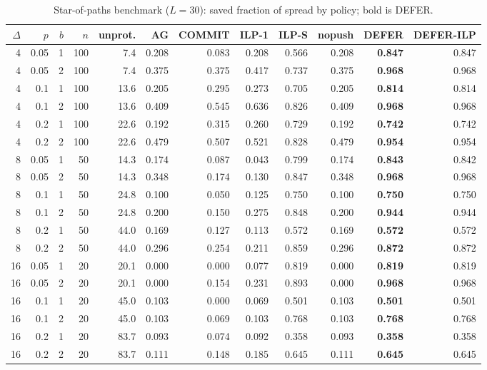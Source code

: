\documentclass[11pt]{article}
\theoremstyle{definition}
\theoremstyle{remark}
\begin{document}
\begin{table}[h]
\centering
\caption{Star-of-paths benchmark ($L=30$): saved fraction of spread by policy; bold is DEFER.\label{tab:sop}}
\footnotesize
\begin{tabular}{rrrrrrrrrrrr}
\hline
$\Delta$ & $p$ & $b$ & $n$ & unprot. & AG & COMMIT & ILP-1 & ILP-S & nopush & DEFER & DEFER-ILP \\
\hline
4 & 0.05 & 1 & 100 & 7.4 & 0.208 & 0.083 & 0.208 & 0.566 & 0.208 & \textbf{0.847} & 0.847 \\
4 & 0.05 & 2 & 100 & 7.4 & 0.375 & 0.375 & 0.417 & 0.737 & 0.375 & \textbf{0.968} & 0.968 \\
4 & 0.1 & 1 & 100 & 13.6 & 0.205 & 0.295 & 0.273 & 0.705 & 0.205 & \textbf{0.814} & 0.814 \\
4 & 0.1 & 2 & 100 & 13.6 & 0.409 & 0.545 & 0.636 & 0.826 & 0.409 & \textbf{0.968} & 0.968 \\
4 & 0.2 & 1 & 100 & 22.6 & 0.192 & 0.315 & 0.260 & 0.729 & 0.192 & \textbf{0.742} & 0.742 \\
4 & 0.2 & 2 & 100 & 22.6 & 0.479 & 0.507 & 0.521 & 0.828 & 0.479 & \textbf{0.954} & 0.954 \\
8 & 0.05 & 1 & 50 & 14.3 & 0.174 & 0.087 & 0.043 & 0.799 & 0.174 & \textbf{0.843} & 0.842 \\
8 & 0.05 & 2 & 50 & 14.3 & 0.348 & 0.174 & 0.130 & 0.847 & 0.348 & \textbf{0.968} & 0.968 \\
8 & 0.1 & 1 & 50 & 24.8 & 0.100 & 0.050 & 0.125 & 0.750 & 0.100 & \textbf{0.750} & 0.750 \\
8 & 0.1 & 2 & 50 & 24.8 & 0.200 & 0.150 & 0.275 & 0.848 & 0.200 & \textbf{0.944} & 0.944 \\
8 & 0.2 & 1 & 50 & 44.0 & 0.169 & 0.127 & 0.113 & 0.572 & 0.169 & \textbf{0.572} & 0.572 \\
8 & 0.2 & 2 & 50 & 44.0 & 0.296 & 0.254 & 0.211 & 0.859 & 0.296 & \textbf{0.872} & 0.872 \\
16 & 0.05 & 1 & 20 & 20.1 & 0.000 & 0.000 & 0.077 & 0.819 & 0.000 & \textbf{0.819} & 0.819 \\
16 & 0.05 & 2 & 20 & 20.1 & 0.000 & 0.154 & 0.231 & 0.893 & 0.000 & \textbf{0.968} & 0.968 \\
16 & 0.1 & 1 & 20 & 45.0 & 0.103 & 0.000 & 0.069 & 0.501 & 0.103 & \textbf{0.501} & 0.501 \\
16 & 0.1 & 2 & 20 & 45.0 & 0.103 & 0.069 & 0.103 & 0.768 & 0.103 & \textbf{0.768} & 0.768 \\
16 & 0.2 & 1 & 20 & 83.7 & 0.093 & 0.074 & 0.092 & 0.358 & 0.093 & \textbf{0.358} & 0.358 \\
16 & 0.2 & 2 & 20 & 83.7 & 0.111 & 0.148 & 0.185 & 0.645 & 0.111 & \textbf{0.645} & 0.645 \\
\hline
\end{tabular}
\end{table}
\end{document}
